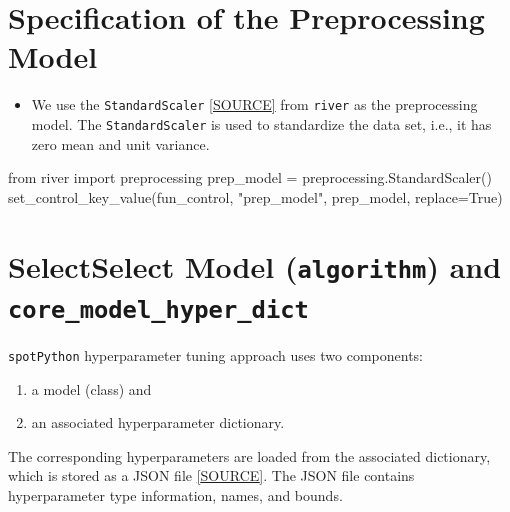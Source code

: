 \documentclass[
  letterpaper,
  DIV=11,
  numbers=noendperiod]{scrreprt}
\newenvironment{Shaded}{\begin{snugshade}}{\end{snugshade}}
\newcommand{\ImportTok}[1]{\textcolor[rgb]{0.00,0.46,0.62}{#1}}
\newcommand{\NormalTok}[1]{\textcolor[rgb]{0.00,0.23,0.31}{#1}}
\newcommand{\OperatorTok}[1]{\textcolor[rgb]{0.37,0.37,0.37}{#1}}
\newcommand{\StringTok}[1]{\textcolor[rgb]{0.13,0.47,0.30}{#1}}
\newcommand{\VariableTok}[1]{\textcolor[rgb]{0.07,0.07,0.07}{#1}}
\providecommand{\tightlist}{%
  \setlength{\itemsep}{0pt}\setlength{\parskip}{0pt}}\usepackage{longtable,booktabs,array}
\begin{document}
\section{Specification of the Preprocessing
Model}\label{specification-of-the-preprocessing-model-1}

\begin{itemize}
\tightlist
\item
  We use the \texttt{StandardScaler}
  \href{https://riverml.xyz/dev/api/preprocessing/StandardScaler/}{{[}SOURCE{]}}
  from \texttt{river} as the preprocessing model. The
  \texttt{StandardScaler} is used to standardize the data set, i.e., it
  has zero mean and unit variance.
\end{itemize}

\begin{Shaded}
\begin{Highlighting}[]
\ImportTok{from}\NormalTok{ river }\ImportTok{import}\NormalTok{ preprocessing}
\NormalTok{prep\_model }\OperatorTok{=}\NormalTok{ preprocessing.StandardScaler()}
\NormalTok{set\_control\_key\_value(fun\_control, }\StringTok{"prep\_model"}\NormalTok{, prep\_model, replace}\OperatorTok{=}\VariableTok{True}\NormalTok{)}
\end{Highlighting}
\end{Shaded}

\section{\texorpdfstring{SelectSelect Model (\texttt{algorithm}) and
\texttt{core\_model\_hyper\_dict}}{SelectSelect Model (algorithm) and core\_model\_hyper\_dict}}\label{selectselect-model-algorithm-and-core_model_hyper_dict-1}

\texttt{spotPython} hyperparameter tuning approach uses two components:

\begin{enumerate}
\def\labelenumi{\arabic{enumi}.}
\tightlist
\item
  a model (class) and
\item
  an associated hyperparameter dictionary.
\end{enumerate}

The corresponding hyperparameters are loaded from the associated
dictionary, which is stored as a JSON file
\href{https://github.com/sequential-parameter-optimization/spotRiver/blob/main/src/spotRiver/data/river_hyper_dict.json}{{[}SOURCE{]}}.
The JSON file contains hyperparameter type information, names, and
bounds.
\end{document}
